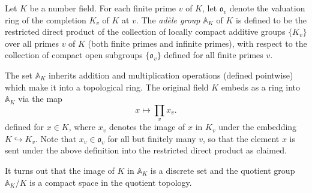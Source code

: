 \documentclass[12pt]{article}
\newcommand{\A}{\mathbb{A}}
\renewcommand{\o}{\mathfrak{o}}
\begin{document}
Let $K$ be a number field. For each finite prime $v$ of $K$, let
$\o_v$ denote the valuation ring of the completion $K_v$ of $K$ at
$v$. The {\em ad\`ele group} $\A_K$ of $K$ is defined to be the
restricted direct product of the collection of locally compact
additive groups $\{K_v\}$ over all primes $v$ of $K$ (both finite
primes and infinite primes), with respect to the collection of compact
open subgroups $\{\o_v\}$ defined for all finite primes $v$.

The set $\A_K$ inherits addition and multiplication operations
(defined pointwise) which make it into a topological ring. The
original field $K$ embeds as a ring into $\A_K$ via the map
$$
x \mapsto \prod_v x_v.
$$
defined for $x \in K$, where $x_v$ denotes the image of $x$ in $K_v$
under the embedding $K \hookrightarrow K_v$. Note that $x_v \in \o_v$
for all but finitely many $v$, so that the element $x$ is sent under
the above definition into the restricted direct product as claimed.

It turns out that the image of $K$ in $\A_K$ is a discrete set and the
quotient group $\A_K/K$ is a compact space in the quotient topology.
\end{document}
